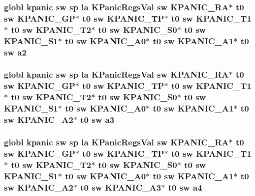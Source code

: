 \hypertarget{riscv_2kpanica_8S_aad0da287fb9a0e51b7226e5df3a8c56d}{
\subsubsection[{a2}]{\setlength{\rightskip}{0pt plus 5cm}globl {\bf kpanic} {\bf sw} {\bf sp} {\bf la} {\bf K\-Panic\-Regs\-Val} {\bf sw} {\bf K\-P\-A\-N\-I\-C\-\_\-\-R\-A}$\ast$ {\bf t0} {\bf sw} {\bf K\-P\-A\-N\-I\-C\-\_\-\-G\-P}$\ast$ {\bf t0} {\bf sw} {\bf K\-P\-A\-N\-I\-C\-\_\-\-T\-P}$\ast$ {\bf t0} {\bf sw} {\bf K\-P\-A\-N\-I\-C\-\_\-\-T1}$\ast$ {\bf t0} {\bf sw} {\bf K\-P\-A\-N\-I\-C\-\_\-\-T2}$\ast$ {\bf t0} {\bf sw} {\bf K\-P\-A\-N\-I\-C\-\_\-\-S0}$\ast$ {\bf t0} {\bf sw} {\bf K\-P\-A\-N\-I\-C\-\_\-\-S1}$\ast$ {\bf t0} {\bf sw} {\bf K\-P\-A\-N\-I\-C\-\_\-\-A0}$\ast$ {\bf t0} {\bf sw} {\bf K\-P\-A\-N\-I\-C\-\_\-\-A1}$\ast$ {\bf t0} {\bf sw} a2}}\label{riscv_2kpanica_8S_aad0da287fb9a0e51b7226e5df3a8c56d}
\hypertarget{riscv_2kpanica_8S_aef1c12591f59927336c38f63fabe8eca}{
\subsubsection[{a3}]{\setlength{\rightskip}{0pt plus 5cm}globl {\bf kpanic} {\bf sw} {\bf sp} {\bf la} {\bf K\-Panic\-Regs\-Val} {\bf sw} {\bf K\-P\-A\-N\-I\-C\-\_\-\-R\-A}$\ast$ {\bf t0} {\bf sw} {\bf K\-P\-A\-N\-I\-C\-\_\-\-G\-P}$\ast$ {\bf t0} {\bf sw} {\bf K\-P\-A\-N\-I\-C\-\_\-\-T\-P}$\ast$ {\bf t0} {\bf sw} {\bf K\-P\-A\-N\-I\-C\-\_\-\-T1}$\ast$ {\bf t0} {\bf sw} {\bf K\-P\-A\-N\-I\-C\-\_\-\-T2}$\ast$ {\bf t0} {\bf sw} {\bf K\-P\-A\-N\-I\-C\-\_\-\-S0}$\ast$ {\bf t0} {\bf sw} {\bf K\-P\-A\-N\-I\-C\-\_\-\-S1}$\ast$ {\bf t0} {\bf sw} {\bf K\-P\-A\-N\-I\-C\-\_\-\-A0}$\ast$ {\bf t0} {\bf sw} {\bf K\-P\-A\-N\-I\-C\-\_\-\-A1}$\ast$ {\bf t0} {\bf sw} {\bf K\-P\-A\-N\-I\-C\-\_\-\-A2}$\ast$ {\bf t0} {\bf sw} a3}}\label{riscv_2kpanica_8S_aef1c12591f59927336c38f63fabe8eca}
\hypertarget{riscv_2kpanica_8S_ab649403f312f925791986486d8e288a8}{
\subsubsection[{a4}]{\setlength{\rightskip}{0pt plus 5cm}globl {\bf kpanic} {\bf sw} {\bf sp} {\bf la} {\bf K\-Panic\-Regs\-Val} {\bf sw} {\bf K\-P\-A\-N\-I\-C\-\_\-\-R\-A}$\ast$ {\bf t0} {\bf sw} {\bf K\-P\-A\-N\-I\-C\-\_\-\-G\-P}$\ast$ {\bf t0} {\bf sw} {\bf K\-P\-A\-N\-I\-C\-\_\-\-T\-P}$\ast$ {\bf t0} {\bf sw} {\bf K\-P\-A\-N\-I\-C\-\_\-\-T1}$\ast$ {\bf t0} {\bf sw} {\bf K\-P\-A\-N\-I\-C\-\_\-\-T2}$\ast$ {\bf t0} {\bf sw} {\bf K\-P\-A\-N\-I\-C\-\_\-\-S0}$\ast$ {\bf t0} {\bf sw} {\bf K\-P\-A\-N\-I\-C\-\_\-\-S1}$\ast$ {\bf t0} {\bf sw} {\bf K\-P\-A\-N\-I\-C\-\_\-\-A0}$\ast$ {\bf t0} {\bf sw} {\bf K\-P\-A\-N\-I\-C\-\_\-\-A1}$\ast$ {\bf t0} {\bf sw} {\bf K\-P\-A\-N\-I\-C\-\_\-\-A2}$\ast$ {\bf t0} {\bf sw} {\bf K\-P\-A\-N\-I\-C\-\_\-\-A3}$\ast$ {\bf t0} {\bf sw} a4}}\label{riscv_2kpanica_8S_ab649403f312f925791986486d8e288a8}
